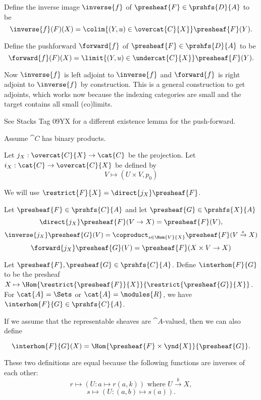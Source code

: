 \begin{definition}
Define the inverse image $\inverse{f}$ of $\presheaf{F}\in \prshfs{D}{A}$ to be 
\[\inverse{f}(F)(X) = \colim{(Y,u)\in \overcat{C}{X}} \presheaf{F}(Y).\]

Define the pushforward $\forward{f}$ of $\presheaf{F}\in \prshfs{D}{A}$ to be 
\[\forward{f}(F)(X) = \limit{(Y,u)\in \undercat{C}{X}} \presheaf{F}(Y).\]

Now $\inverse{f}$ is left adjoint to $\inverse{f}$ and $\forward{f}$ is right adjoint to $\inverse{f}$ by construction.
This is a general construction to get adjoints, which works now because the indexing categories are small and the target contains all small (co)limits.

See Stacks Tag 09YX for a different existence lemma for the push-forward.
\end{definition}

Assume $\cat{C}$ has binary products.
\begin{definition}
Let $j_X:\overcat{C}{X}\rightarrow \cat{C}$ be the projection.
Let $i_X:\cat{C}\rightarrow \overcat{C}{X}$ be defined by
\[V\mapsto (U\times V,p_0)\]

We will use $\restrict{F}{X}=\direct{j_X} \presheaf{F}$.
\end{definition}

\begin{lemma}
Let $\presheaf{F}\in \prshfs{C}{A}$ and let $\presheaf{G}\in \prshfs{X}{A}$
\[ \direct{j_X}\presheaf{F}(V\rightarrow X) = \presheaf{F}(V),\]
\[\inverse{j_X}\presheaf{G}(V) = \coproduct_{s\in \Hom{V}{X}} \presheaf{F}(V\xrightarrow{s} X)\]
\[\forward{j_X}\presheaf{G}(V) = \presheaf{F}(X\times V \rightarrow X)\]
\end{lemma}


\begin{definition}
Let $\presheaf{F},\presheaf{G}\in \prshfs{C}{A}$. 
Define $\interhom{F}{G}$ to be the presheaf $X \mapsto \Hom{\restrict{\presheaf{F}}{X}}{\restrict{\presheaf{G}}{X}}$.
For $\cat{A} = \Sets$ or $\cat{A} = \modules{R}$, we have $\interhom{F}{G} \in \prshfs{C}{A}$.

If we assume that the representable sheaves are $\cat{A}$-valued, then we can also define

\[\interhom{F}{G}(X) = \Hom{\presheaf{F}\times \ynd{X}}{\presheaf{G}}.\]

These two definitions are equal because the following functions are inverses of each other:
\[r\mapsto (U:a\mapsto r(a,k)) \mbox{ where } U\xrightarrow{k} X,\]
\[s\mapsto (U:(a,b)\mapsto s(a)).\]

\end{definition}

